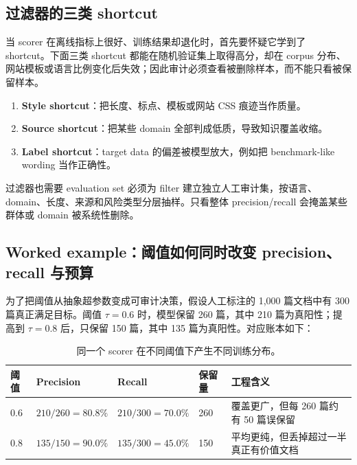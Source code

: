 \documentclass[a4paper]{article}
\begin{document}
\subsection{过滤器的三类 shortcut}

当 scorer 在离线指标上很好、训练结果却退化时，首先要怀疑它学到了 shortcut。下面三类 shortcut 都能在随机验证集上取得高分，却在 corpus 分布、网站模板或语言比例变化后失效；因此审计必须查看被删除样本，而不能只看被保留样本。

\begin{enumerate}
\item \textbf{Style shortcut}：把长度、标点、模板或网站 CSS 痕迹当作质量。
\item \textbf{Source shortcut}：把某些 domain 全部判成低质，导致知识覆盖收缩。
\item \textbf{Label shortcut}：target data 的偏差被模型放大，例如把 benchmark-like wording 当作正确性。
\end{enumerate}

\begin{warningbox}{过滤器也需要 evaluation set}
必须为 filter 建立独立人工审计集，按语言、domain、长度、来源和风险类型分层抽样。只看整体 precision/recall 会掩盖某些群体或 domain 被系统性删除。
\end{warningbox}

\subsection{Worked example：阈值如何同时改变 precision、recall 与预算}

为了把阈值从抽象超参数变成可审计决策，假设人工标注的 1,000 篇文档中有 300 篇真正满足目标。阈值 $\tau=0.6$ 时，模型保留 260 篇，其中 210 篇为真阳性；提高到 $\tau=0.8$ 后，只保留 150 篇，其中 135 篇为真阳性。对应账本如下：

\begin{table}[H]
\centering
\begin{tabular}{L{0.15\textwidth}L{0.14\textwidth}L{0.14\textwidth}L{0.13\textwidth}L{0.24\textwidth}}
\toprule
阈值 & Precision & Recall & 保留量 & 工程含义 \\
\midrule
$0.6$ & $210/260=80.8\%$ & $210/300=70.0\%$ & 260 & 覆盖更广，但每 260 篇约有 50 篇误保留 \\
$0.8$ & $135/150=90.0\%$ & $135/300=45.0\%$ & 150 & 平均更纯，但丢掉超过一半真正有价值文档 \\
\bottomrule
\end{tabular}
\caption{同一个 scorer 在不同阈值下产生不同训练分布。}
\end{table}
\end{document}

